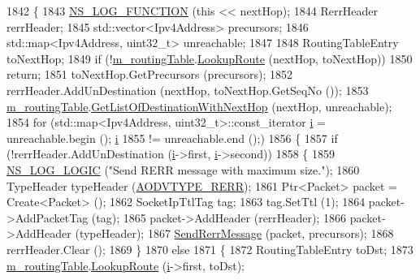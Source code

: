 \begin{DoxyCode}
1842 \{
1843   \hyperlink{log-macros-disabled_8h_a90b90d5bad1f39cb1b64923ea94c0761}{NS\_LOG\_FUNCTION} (\textcolor{keyword}{this} << nextHop);
1844   RerrHeader rerrHeader;
1845   std::vector<Ipv4Address> precursors;
1846   std::map<Ipv4Address, uint32\_t> unreachable;
1847 
1848   RoutingTableEntry toNextHop;
1849   \textcolor{keywordflow}{if} (!\hyperlink{classns3_1_1aodv_1_1RoutingProtocol_a4e1003a34c8adc96db71096d88c98ae0}{m\_routingTable}.\hyperlink{classns3_1_1aodv_1_1RoutingTable_a90cbc8a2c65cd68ccdaf768fcbb5d723}{LookupRoute} (nextHop, toNextHop))
1850     \textcolor{keywordflow}{return};
1851   toNextHop.GetPrecursors (precursors);
1852   rerrHeader.AddUnDestination (nextHop, toNextHop.GetSeqNo ());
1853   \hyperlink{classns3_1_1aodv_1_1RoutingProtocol_a4e1003a34c8adc96db71096d88c98ae0}{m\_routingTable}.\hyperlink{classns3_1_1aodv_1_1RoutingTable_a0315dabaf863f63cce72eed5c97bd423}{GetListOfDestinationWithNextHop} (nextHop, 
      unreachable);
1854   \textcolor{keywordflow}{for} (std::map<Ipv4Address, uint32\_t>::const\_iterator \hyperlink{bernuolliDistribution_8m_a6f6ccfcf58b31cb6412107d9d5281426}{i} = unreachable.begin (); 
      \hyperlink{bernuolliDistribution_8m_a6f6ccfcf58b31cb6412107d9d5281426}{i}
1855        != unreachable.end ();)
1856     \{
1857       \textcolor{keywordflow}{if} (!rerrHeader.AddUnDestination (\hyperlink{bernuolliDistribution_8m_a6f6ccfcf58b31cb6412107d9d5281426}{i}->first, \hyperlink{bernuolliDistribution_8m_a6f6ccfcf58b31cb6412107d9d5281426}{i}->second))
1858         \{
1859           \hyperlink{group__logging_ga88acd260151caf2db9c0fc84997f45ce}{NS\_LOG\_LOGIC} (\textcolor{stringliteral}{"Send RERR message with maximum size."});
1860           TypeHeader typeHeader (\hyperlink{namespacens3_1_1aodv_a8cf417608302ba0ed75225c976944d44a363aea0c29a02f5899cf088654c6d844}{AODVTYPE\_RERR});
1861           Ptr<Packet> packet = Create<Packet> ();
1862           SocketIpTtlTag tag;
1863           tag.SetTtl (1);
1864           packet->AddPacketTag (tag);
1865           packet->AddHeader (rerrHeader);
1866           packet->AddHeader (typeHeader);
1867           \hyperlink{classns3_1_1aodv_1_1RoutingProtocol_abc216040fe7b7ac100ea7bf2ce9a0bdb}{SendRerrMessage} (packet, precursors);
1868           rerrHeader.Clear ();
1869         \}
1870       \textcolor{keywordflow}{else}
1871         \{
1872           RoutingTableEntry toDst;
1873           \hyperlink{classns3_1_1aodv_1_1RoutingProtocol_a4e1003a34c8adc96db71096d88c98ae0}{m\_routingTable}.\hyperlink{classns3_1_1aodv_1_1RoutingTable_a90cbc8a2c65cd68ccdaf768fcbb5d723}{LookupRoute} (\hyperlink{bernuolliDistribution_8m_a6f6ccfcf58b31cb6412107d9d5281426}{i}->first, toDst);

\end{DoxyCode}
